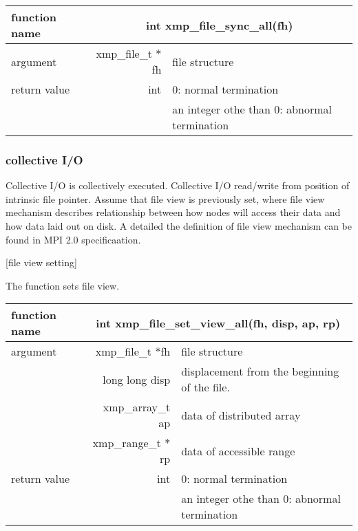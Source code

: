    \begin{table}[h]
    \begin{center}
     \begin{tabular}{|l|r|p{80mm}|}
      \hline
      {\bf function name}  & \multicolumn{2}{c|}{\bf int
      xmp\_file\_sync\_all(fh)} \\ \hline \hline
      argument & xmp\_file\_t $*$fh & file structure \\ \hline
      return value & int & 0: normal termination \\
      &  & an integer othe than 0: abnormal termination \\ \hline
      \end{tabular}
     \end{center}
    \label{tb:aaa}
   \end{table}

   \clearpage

   \subsubsection{collective I/O}

   Collective I/O is collectively executed.
   Collective I/O read/write from position of intrinsic file pointer.
   Assume that file view is previously set, where file view mechanism
   describes relationship between how nodes will access their data
   and how data laid out on disk.
   A detailed the definition of file view mechanism can be found in MPI
   2.0 specificaation.

   [file view setting]

   The function sets file view.

   \begin{table}[h]
    \begin{center}
     \begin{tabular}{|l|r|p{70mm}|}
      \hline
      {\bf function name}  & \multicolumn{2}{c|}{\bf int xmp\_file\_set\_view\_all(fh,
      disp, ap, rp)} \\ \hline \hline
      argument & xmp\_file\_t $*$fh & file structure \\ \cline{2-3}
      & long long disp & displacement from the beginning of the file. \\ \cline{2-3}
      & xmp\_array\_t ap & data of distributed array \\ \cline{2-3}
      & xmp\_range\_t $*$rp & data of accessible range \\ \hline
      return value & int & 0: normal termination \\
      &  & an integer othe than 0: abnormal termination \\ \hline
      \end{tabular}
     \end{center}
    \label{tb:aaa}
   \end{table}

